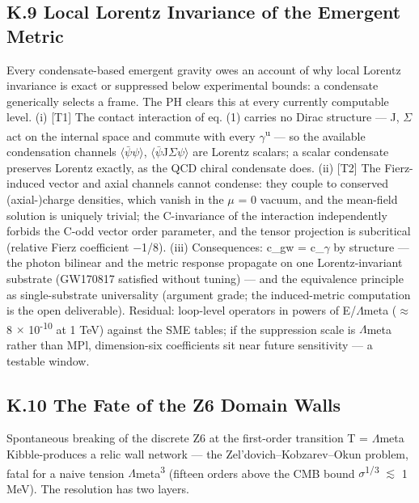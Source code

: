 \documentclass[11pt,letterpaper]{article}
\begin{document}
\subsection*{K.9  Local Lorentz Invariance of the Emergent Metric}

\noindent Every condensate-based emergent gravity owes an account of why local Lorentz invariance is exact or suppressed below experimental bounds: a condensate generically selects a frame. The PH clears this at every currently computable level. (i) [T1] The contact interaction of eq. (1) carries no Dirac structure --- J, $\Sigma$ act on the internal space and commute with every $\gamma$\textsuperscript{u} --- so the available condensation channels $\langle$$\bar{\psi}$$\psi$$\rangle$, $\langle$$\bar{\psi}$J$\Sigma$$\psi$$\rangle$ are Lorentz scalars; a scalar condensate preserves Lorentz exactly, as the QCD chiral condensate does. (ii) [T2] The Fierz-induced vector and axial channels cannot condense: they couple to conserved (axial-)charge densities, which vanish in the $\mu$ = 0 vacuum, and the mean-field solution is uniquely trivial; the C-invariance of the interaction independently forbids the C-odd vector order parameter, and the tensor projection is subcritical (relative Fierz coefficient $-$1/8). (iii) Consequences: c\_gw = c\_$\gamma$ by structure --- the photon bilinear and the metric response propagate on one Lorentz-invariant substrate (GW170817 satisfied without tuning) --- and the equivalence principle as single-substrate universality (argument grade; the induced-metric computation is the open deliverable). Residual: loop-level operators in powers of E/$\Lambda$meta ($\approx$ 8 $\times$ 10\textsuperscript{-10} at 1 TeV) against the SME tables; if the suppression scale is $\Lambda$meta rather than MPl, dimension-six coefficients sit near future sensitivity --- a testable window.

\subsection*{K.10  The Fate of the Z6 Domain Walls}

\noindent Spontaneous breaking of the discrete Z6 at the first-order transition T = $\Lambda$meta Kibble-produces a relic wall network --- the Zel'dovich--Kobzarev--Okun problem, fatal for a naive tension $\Lambda$meta\textsuperscript{3} (fifteen orders above the CMB bound $\sigma$\textsuperscript{1/3} $\lesssim$ 1 MeV). The resolution has two layers.
\end{document}
